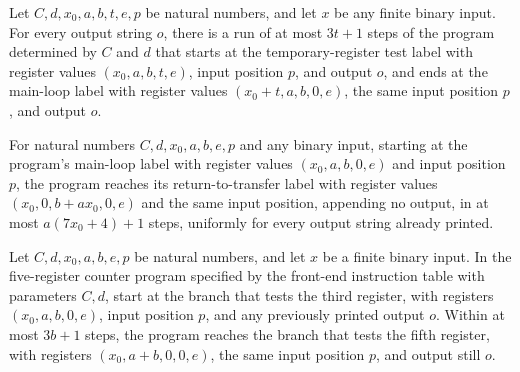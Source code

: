 \begin{lemma}
\label{Complexity.UTab.Front.goes_tloop}
\leanok
{}
Let $C,d,x_0,a,b,t,e,p$ be natural numbers, and let $x$ be any finite binary input. For
every output string $o$, there is a run of at most $3t+1$ steps of the program
determined by $C$ and $d$ that starts at the temporary-register test label with register
values $(x_0,a,b,t,e)$, input position $p$, and output $o$, and ends at the main-loop
label with register values $(x_0+t,a,b,0,e)$, the same input position $p$, and output
$o$.
\end{lemma}

\begin{lemma}
\label{Complexity.UTab.Front.goes_aloop}
\leanok
{}
For natural numbers $C,d,x_0,a,b,e,p$ and any binary input, starting at the program's
main-loop label with register values $(x_0,a,b,0,e)$ and input position $p$, the program
reaches its return-to-transfer label with register values $(x_0,0,b+a x_0,0,e)$ and the
same input position, appending no output, in at most $a(7x_0+4)+1$ steps, uniformly for
every output string already printed.
\end{lemma}

\begin{lemma}
\label{Complexity.UTab.Front.goes_bloop}
\leanok
{}
Let $C,d,x_0,a,b,e,p$ be natural numbers, and let $x$ be a finite binary input. In the
five-register counter program specified by the front-end instruction table with
parameters $C,d$, start at the branch that tests the third register, with registers
$(x_0,a,b,0,e)$, input position $p$, and any previously printed output $o$. Within at
most $3b+1$ steps, the program reaches the branch that tests the fifth register, with
registers $(x_0,a+b,0,0,e)$, the same input position $p$, and output still $o$.
\end{lemma}

